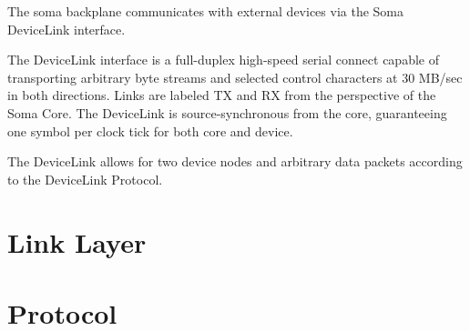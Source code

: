 
The soma backplane communicates with external devices via the Soma
DeviceLink interface.

The DeviceLink interface is a full-duplex high-speed serial connect
capable of transporting arbitrary byte streams and selected control
characters at 30 MB/sec in both directions. Links are labeled TX and
RX from the perspective of the Soma Core. The DeviceLink is
source-synchronous from the core, guaranteeing one symbol per clock
tick for both core and device.

The DeviceLink allows for two device nodes and arbitrary data packets
according to the DeviceLink Protocol.

\section {Link Layer}



\section {Protocol }



